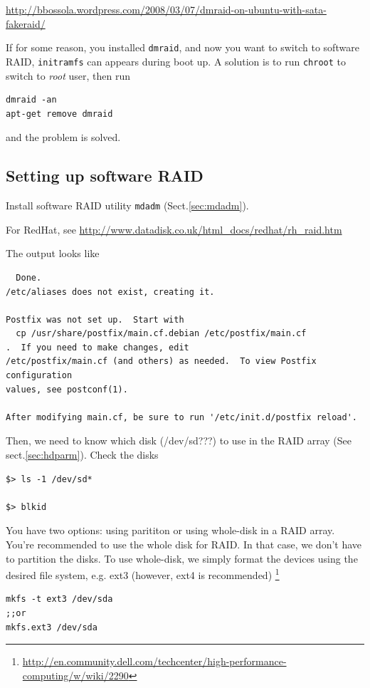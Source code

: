 \url{http://bbossola.wordpress.com/2008/03/07/dmraid-on-ubuntu-with-sata-fakeraid/}


If for some reason, you installed \verb!dmraid!, and now you want to switch to
software RAID, \verb!initramfs! can appears during boot up. A solution is to
run \verb!chroot! to switch to {\it root} user, then run
\begin{verbatim}
dmraid -an
apt-get remove dmraid
\end{verbatim}
and the problem is solved.


\subsection{Setting up software RAID}
\label{sec:setup_RAID}

 Install software RAID utility \verb!mdadm! (Sect.\ref{sec:mdadm}).
  
\begin{framed}
For RedHat, see \url{http://www.datadisk.co.uk/html_docs/redhat/rh_raid.htm}
\end{framed}

The output looks like
\begin{verbatim}
  Done.
/etc/aliases does not exist, creating it.

Postfix was not set up.  Start with
  cp /usr/share/postfix/main.cf.debian /etc/postfix/main.cf
.  If you need to make changes, edit
/etc/postfix/main.cf (and others) as needed.  To view Postfix configuration
values, see postconf(1).

After modifying main.cf, be sure to run '/etc/init.d/postfix reload'.
  \end{verbatim}
  
Then, we need to know which disk (/dev/sd???) to use in the RAID array (See
sect.\ref{sec:hdparm}).   Check the disks
  \begin{verbatim}
$> ls -1 /dev/sd*
  
$> blkid  
  \end{verbatim}

You have two options: using parititon or using whole-disk in a RAID array.
You're recommended to use the whole disk for RAID. In that case, we don't have
to partition the disks. To use whole-disk, we simply format the devices using
the desired file system, e.g. ext3 (however, ext4 is recommended)
\footnote{\url{http://en.community.dell.com/techcenter/high-performance-computing/w/wiki/2290}}
\begin{verbatim}
mkfs -t ext3 /dev/sda
;;or
mkfs.ext3 /dev/sda
\end{verbatim}

